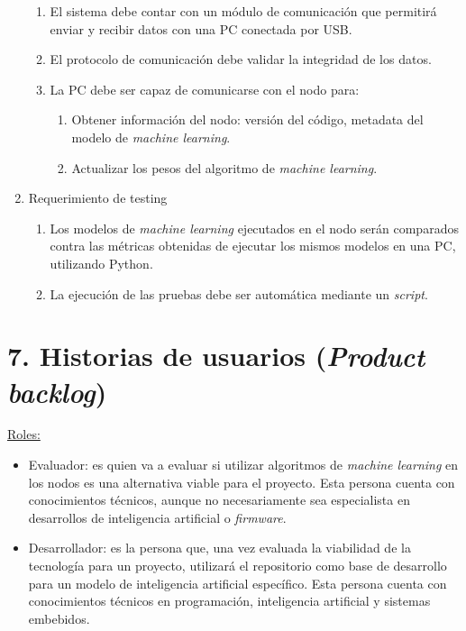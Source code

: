 \documentclass[
11pt, %
codirector, %
]{charter}
\begin{document}
\begin{enumerate}
\begin{enumerate}
		\item El sistema debe contar con un módulo de comunicación que permitirá enviar y recibir datos con una PC conectada por USB.
		\item El protocolo de comunicación debe validar la integridad de los datos.
		\item La PC debe ser capaz de comunicarse con el nodo para:
			\begin{enumerate}
				\item Obtener información del nodo: versión del código, metadata del modelo de \textit{machine learning}.
				\item Actualizar los pesos del algoritmo de \textit{machine learning}.
			\end{enumerate}
		\end{enumerate}
	\item Requerimiento de testing
		\begin{enumerate}
			\item Los modelos de \textit{machine learning} ejecutados en el nodo serán comparados contra las métricas obtenidas de ejecutar los mismos modelos en una PC, utilizando Python.
			\item La ejecución de las pruebas debe ser automática mediante un \textit{script}.
		\end{enumerate}
\end{enumerate}

\section{7. Historias de usuarios (\textit{Product backlog})}
\label{sec:backlog}

\underline{Roles:} 
\begin{itemize}
\item Evaluador: es quien va a evaluar si utilizar algoritmos de \textit{machine learning} en los nodos es una alternativa viable para el proyecto. Esta persona cuenta con conocimientos técnicos, aunque no necesariamente sea especialista en desarrollos de inteligencia artificial o \textit{firmware}.
\item Desarrollador: es la persona que, una vez evaluada la viabilidad de la tecnología para un proyecto, utilizará el repositorio como base de desarrollo para un modelo de inteligencia artificial específico. Esta persona cuenta con conocimientos técnicos en programación, inteligencia artificial y sistemas embebidos.
\end{itemize}
\end{document}

